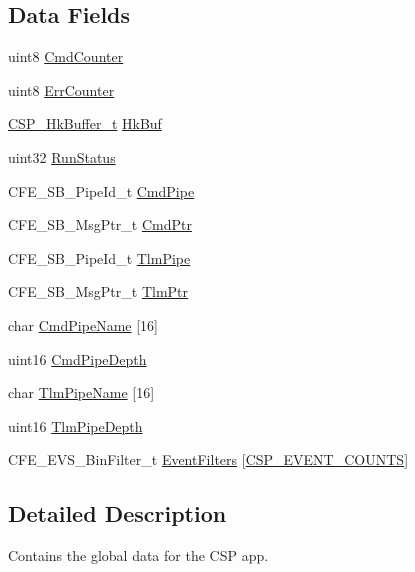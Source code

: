 \subsection*{Data Fields}
\begin{DoxyCompactItemize}
\item 
uint8 \hyperlink{structCSP__AppData__t_a8986c09296a75a5262d2f2c26977b02f}{Cmd\+Counter}
\item 
uint8 \hyperlink{structCSP__AppData__t_a45286022f8a689f1a394a88655b922a8}{Err\+Counter}
\item 
\hyperlink{unionCSP__HkBuffer__t}{C\+S\+P\+\_\+\+Hk\+Buffer\+\_\+t} \hyperlink{structCSP__AppData__t_aab121280945e376f25d7f97682155cac}{Hk\+Buf}
\item 
uint32 \hyperlink{structCSP__AppData__t_a845022a44aa2aa404760c0b01df1525d}{Run\+Status}
\item 
C\+F\+E\+\_\+\+S\+B\+\_\+\+Pipe\+Id\+\_\+t \hyperlink{structCSP__AppData__t_a9f410d09f39c64e00b3fe9a2008307b0}{Cmd\+Pipe}
\item 
C\+F\+E\+\_\+\+S\+B\+\_\+\+Msg\+Ptr\+\_\+t \hyperlink{structCSP__AppData__t_abecef0fcabdc74f40bd53d3578790035}{Cmd\+Ptr}
\item 
C\+F\+E\+\_\+\+S\+B\+\_\+\+Pipe\+Id\+\_\+t \hyperlink{structCSP__AppData__t_a4c13b791693039d3b068abbf8f223e9f}{Tlm\+Pipe}
\item 
C\+F\+E\+\_\+\+S\+B\+\_\+\+Msg\+Ptr\+\_\+t \hyperlink{structCSP__AppData__t_a313b719459ef034ee895674f0062697f}{Tlm\+Ptr}
\item 
char \hyperlink{structCSP__AppData__t_ac369b80b6af7827b80dfad97867a3a9e}{Cmd\+Pipe\+Name} \mbox{[}16\mbox{]}
\item 
uint16 \hyperlink{structCSP__AppData__t_a54d4f4e91cf45390ae52ede8b2fa521c}{Cmd\+Pipe\+Depth}
\item 
char \hyperlink{structCSP__AppData__t_a32b2129a2ffc12c7defdfef952592c66}{Tlm\+Pipe\+Name} \mbox{[}16\mbox{]}
\item 
uint16 \hyperlink{structCSP__AppData__t_a8260ef75246793bea80d58e1001cb225}{Tlm\+Pipe\+Depth}
\item 
C\+F\+E\+\_\+\+E\+V\+S\+\_\+\+Bin\+Filter\+\_\+t \hyperlink{structCSP__AppData__t_a268c8aab3acc1435ffe275127ad10602}{Event\+Filters} \mbox{[}\hyperlink{csp__app__events_8h_a944268ecbb1a1b497a4bdc0e638f5bf6}{C\+S\+P\+\_\+\+E\+V\+E\+N\+T\+\_\+\+C\+O\+U\+N\+TS}\mbox{]}
\end{DoxyCompactItemize}


\subsection{Detailed Description}
Contains the global data for the C\+SP app. 

